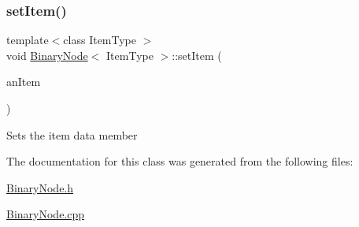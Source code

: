 \subsubsection{\texorpdfstring{set\+Item()}{setItem()}}
{\footnotesize\ttfamily template$<$class Item\+Type $>$ \\
void \hyperlink{class_binary_node}{Binary\+Node}$<$ Item\+Type $>$\+::set\+Item (\begin{DoxyParamCaption}\item[{const Item\+Type \&}]{an\+Item }\end{DoxyParamCaption})}

Sets the item data member 

The documentation for this class was generated from the following files\+:\begin{DoxyCompactItemize}
\item 
\hyperlink{_binary_node_8h}{Binary\+Node.\+h}\item 
\hyperlink{_binary_node_8cpp}{Binary\+Node.\+cpp}\end{DoxyCompactItemize}
